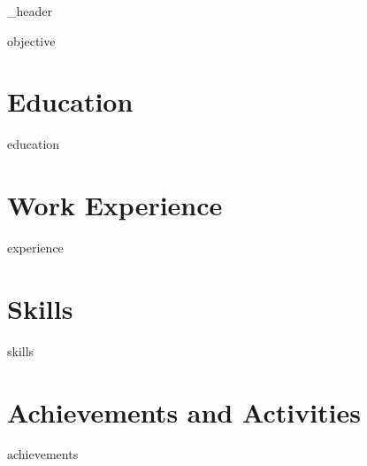 \documentclass[letter,10pt]{article}
\author{Matthew Wright} %
\begin{document}
{_header}
\vspace{5pt}

{objective}
\vspace*{7pt}

\section{Education}
{education}
\vspace*{7pt}


\section{Work Experience}
{experience}
\vspace*{7pt}



\section{Skills}
\vspace*{3pt}
{skills}
\vspace*{7pt}

\section{Achievements and Activities}
{achievements}

\end{document}
